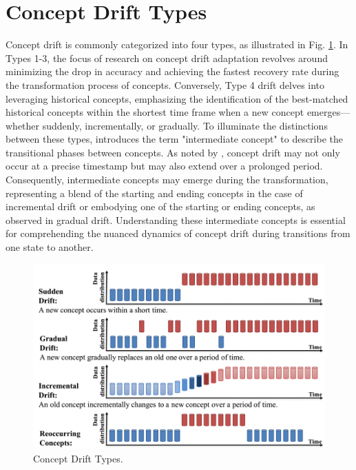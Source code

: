 \section{Concept Drift Types}
\label{sec:background_concept_drift_types}
Concept drift is commonly categorized into four types, as illustrated in Fig. \ref{fig:concept-drift-types}. In Types 1-3, the focus of research on concept drift adaptation revolves around minimizing the drop in accuracy and achieving the fastest recovery rate during the transformation process of concepts. Conversely, Type 4 drift delves into leveraging historical concepts, emphasizing the identification of the best-matched historical concepts within the shortest time frame when a new concept emerges—whether suddenly, incrementally, or gradually. To illuminate the distinctions between these types, \cite{losing2016knn} introduces the term "intermediate concept" to describe the transitional phases between concepts. As noted by \cite{liu2018making}, concept drift may not only occur at a precise timestamp but may also extend over a prolonged period. Consequently, intermediate concepts may emerge during the transformation, representing a blend of the starting and ending concepts in the case of incremental drift or embodying one of the starting or ending concepts, as observed in gradual drift. Understanding these intermediate concepts is essential for comprehending  the nuanced dynamics of concept drift during transitions from one state to another.
 
\begin{figure}[!ht]
    \centering
    \includegraphics[width=.9\textwidth]{2_Background/figures/concept_drift_types.png}
    \caption{Concept Drift Types.}
    \label{fig:concept-drift-types}
\end{figure}

